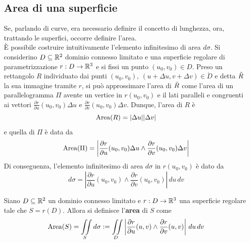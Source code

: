 \subsection{Area di una superficie}
Se, parlando di curve, era necessario definire il concetto di lunghezza, ora, trattando le superfici, occorre definire l'area.\\
È possibile costruire intuitivamente l'elemento infinitesimo di area $d \sigma$. Si considerino $D \subseteq \mathbb{R}^2$ dominio connesso limitato e una superficie regolare di parametrizzazione $r: D \to \mathbb{R}^3$ e si fissi un punto $(u_0, v_0) \in D$. Preso un rettangolo $R$ individuato dai punti $(u_0, v_0),\ (u+ \Delta u, v + \Delta v) \in \mathring{D}$ e detta $\Tilde{R}$  la sua immagine tramite $r$, si può approssimare l'area di $\Tilde{R}$ come l'area di un parallelogramma $\Pi$ avente un vertice in $r(u_0,v_0)$ e il lati paralleli e congruenti ai vettori $\tfrac{\partial r}{\partial u} (u_0,v_0) \Delta u$ e $\tfrac{\partial r}{\partial v}(u_0,v_0) \Delta v$. Dunque, l'area di $R$ è
\begin{equation*}
\operatorname{Area}(R)=|\Delta u||\Delta v|    
\end{equation*}
 e quella di $\Pi$ è data da
 \begin{equation*}
 \operatorname{Area}(\Pi)= \left|\frac{\partial r}{\partial u} (u_0,v_0) \Delta u \wedge \frac{\partial r}{\partial v}(u_0,v_0) \Delta v \right|
 \end{equation*}
 Di conseguenza, l'elemento infinitesimo di area $d \sigma$ in $r(u_0, v_0)$ è dato da
 \begin{equation*}
     d\sigma= \left|\frac{\partial r}{\partial u} (u_0,v_0) \wedge \frac{\partial r}{\partial v}(u_0,v_0) \right|\, du\, dv
 \end{equation*}
 \begin{definition} \label{Def: Area di una superficie}
     Siano $D \subseteq \mathbb{R}^2$ un dominio connesso limitato e $r: D \to \mathbb{R}^3$ una superficie regolare tale che $S=r(D)$. Allora si definisce l'\textbf{area} di $S$ come
     \begin{equation*}
         \operatorname{Area}(S)= \iint\limits_{S}{d\sigma} := \iint\limits_{D}{\left|\frac{\partial r}{\partial u} (u,v) \wedge \frac{\partial r}{\partial v}(u,v) \right|\, du\, dv}
     \end{equation*}
 \end{definition}

